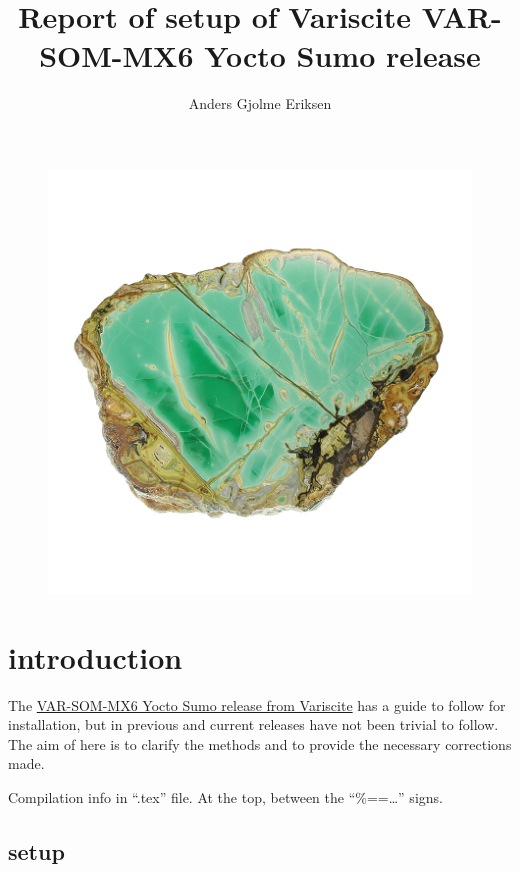 \documentclass[10pt]{article}
\begin{document}
\title{%
Report of setup of Variscite
\large
VAR-SOM-MX6 Yocto Sumo release
}

\author{Anders Gjolme Eriksen}
\maketitle

\begin{figure}[hbtp]
\includegraphics[scale=0.4]{./variscite.jpg}
\end{figure}

\tableofcontents
\newpage

\section{introduction}

The \href{http://variwiki.com/index.php?title=VAR-SOM-MX6\_Yocto\&release=RELEASE\_SUMO\_V1.1\_VAR-SOM-MX6}{VAR-SOM-MX6 Yocto Sumo release from Variscite}
has a guide to follow for installation, but in previous and current releases have not been trivial to follow. The aim of here is to clarify the
methods and to provide the necessary corrections made.

Compilation info in ``.tex'' file. At the top, between the ``\%==\ldots'' signs.

\subsection{setup}
\end{document}
